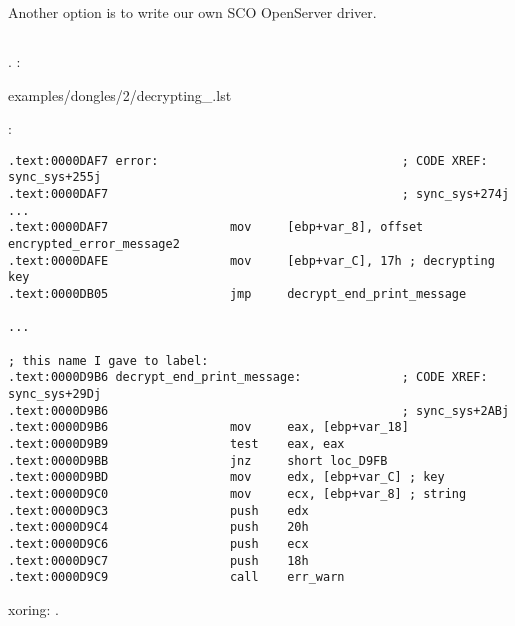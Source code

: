 {Another option is to write our own SCO OpenServer driver}.

\subsection{}

.
  
:


{examples/dongles/2/decrypting_\LANG.lst}

:

\begin{lstlisting}
.text:0000DAF7 error:                                  ; CODE XREF: sync_sys+255j
.text:0000DAF7                                         ; sync_sys+274j ...
.text:0000DAF7                 mov     [ebp+var_8], offset encrypted_error_message2
.text:0000DAFE                 mov     [ebp+var_C], 17h ; decrypting key
.text:0000DB05                 jmp     decrypt_end_print_message

...

; this name I gave to label:
.text:0000D9B6 decrypt_end_print_message:              ; CODE XREF: sync_sys+29Dj
.text:0000D9B6                                         ; sync_sys+2ABj
.text:0000D9B6                 mov     eax, [ebp+var_18]
.text:0000D9B9                 test    eax, eax
.text:0000D9BB                 jnz     short loc_D9FB
.text:0000D9BD                 mov     edx, [ebp+var_C] ; key
.text:0000D9C0                 mov     ecx, [ebp+var_8] ; string
.text:0000D9C3                 push    edx
.text:0000D9C4                 push    20h
.text:0000D9C6                 push    ecx
.text:0000D9C7                 push    18h
.text:0000D9C9                 call    err_warn
\end{lstlisting}

 \gls{xoring}: 
.

